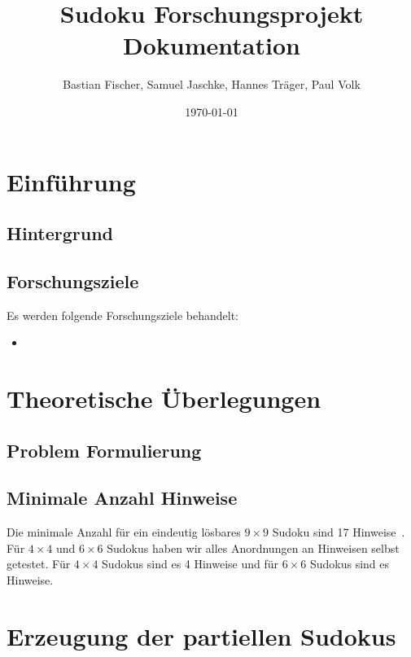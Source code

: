 \documentclass[12pt,a4paper]{article}
\title{Sudoku Forschungsprojekt Dokumentation}
\author{Bastian Fischer, Samuel Jaschke, Hannes Träger, Paul Volk}
\date{\today}
\begin{document}
\maketitle

\begin{abstract}
\end{abstract}

\section{Einführung}
\subsection{Hintergrund}

\subsection{Forschungsziele}
Es werden folgende Forschungsziele behandelt:
\begin{itemize}
    \item  
\end{itemize}

\section{Theoretische Überlegungen}

\subsection{Problem Formulierung}

\subsection{Minimale Anzahl Hinweise}
Die minimale Anzahl für ein eindeutig lösbares $9 \times 9$ Sudoku sind 17 Hinweise~\cite{DBLP:journals/corr/abs-1201-0749}.
Für $4 \times 4$ und $6 \times 6$ Sudokus haben wir alles Anordnungen an Hinweisen selbst getestet.
Für $4 \times 4$ Sudokus sind es 4 Hinweise und für $6 \times 6$ Sudokus sind es %
Hinweise.








\section{Erzeugung der partiellen Sudokus}
\end{document}
